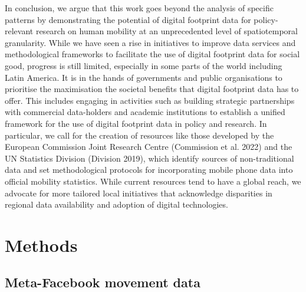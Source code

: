\documentclass[
  11pt,
]{article}
\begin{document}
In conclusion, we argue that this work goes beyond the analysis of
specific patterns by demonstrating the potential of digital footprint
data for policy-relevant research on human mobility at an unprecedented
level of spatiotemporal granularity. While we have seen a rise in
initiatives to improve data services and methodological frameworks to
facilitate the use of digital footprint data for social good, progress
is still limited, especially in some parts of the world including Latin
America. It is in the hands of governments and public organisations to
prioritise the maximisation the societal benefits that digital footprint
data has to offer. This includes engaging in activities such as building
strategic partnerships with commercial data-holders and academic
institutions to establish a unified framework for the use of digital
footprint data in policy and research. In particular, we call for the
creation of resources like those developed by the European Commission
Joint Research Centre (Commission et al. 2022) and the UN Statistics
Division (Division 2019), which identify sources of non-traditional data
and set methodological protocols for incorporating mobile phone data
into official mobility statistics. While current resources tend to have
a global reach, we advocate for more tailored local initiatives that
acknowledge disparities in regional data availability and adoption of
digital technologies.

\section{Methods}\label{sec-methods}

\subsection{Meta-Facebook movement
data}\label{meta-facebook-movement-data}
\end{document}
